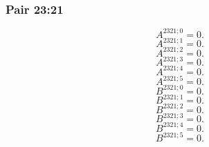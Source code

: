 \documentclass[11pt,a4paper]{article}
\begin{document}
\subsubsection{Pair 23:21}
\begin{equation}
A^{2321;0}=0.
\label{eq:cat-map-462}
\end{equation}
\begin{equation}
A^{2321;1}=0.
\label{eq:cat-map-463}
\end{equation}
\begin{equation}
A^{2321;2}=0.
\label{eq:cat-map-464}
\end{equation}
\begin{equation}
A^{2321;3}=0.
\label{eq:cat-map-465}
\end{equation}
\begin{equation}
A^{2321;4}=0.
\label{eq:cat-map-466}
\end{equation}
\begin{equation}
A^{2321;5}=0.
\label{eq:cat-map-467}
\end{equation}
\begin{equation}
B^{2321;0}=0.
\label{eq:cat-map-468}
\end{equation}
\begin{equation}
B^{2321;1}=0.
\label{eq:cat-map-469}
\end{equation}
\begin{equation}
B^{2321;2}=0.
\label{eq:cat-map-470}
\end{equation}
\begin{equation}
B^{2321;3}=0.
\label{eq:cat-map-471}
\end{equation}
\begin{equation}
B^{2321;4}=0.
\label{eq:cat-map-472}
\end{equation}
\begin{equation}
B^{2321;5}=0.
\label{eq:cat-map-473}
\end{equation}
\end{document}
